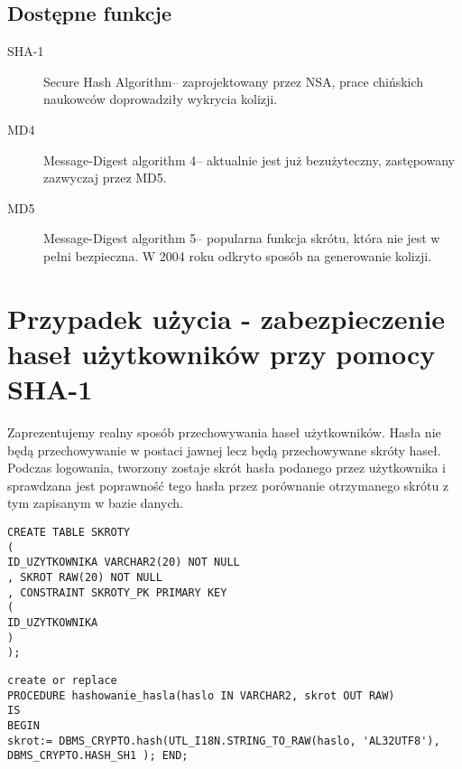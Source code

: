 \documentclass[12pt, a4paper]{article}
\begin{document}
\subsection{Dostępne funkcje}
\begin{description}
\item[SHA-1]Secure Hash Algorithm-- zaprojektowany przez NSA, prace chińskich naukowców doprowadziły wykrycia kolizji.
\item[MD4] Message-Digest algorithm 4-- aktualnie jest już bezużyteczny, zastępowany zazwyczaj przez MD5.
\item[MD5] Message-Digest algorithm 5-- popularna funkcja skrótu, która nie jest w pełni bezpieczna. W 2004 roku odkryto sposób na generowanie kolizji.
\end{description}

\section{Przypadek użycia - zabezpieczenie haseł użytkowników przy pomocy
\mbox{SHA-1}}
 Zaprezentujemy realny sposób przechowywania haseł użytkowników. Hasła nie będą
 przechowywanie w postaci jawnej lecz będą przechowywane skróty haseł. Podczas
 logowania, tworzony zostaje skrót hasła podanego przez użytkownika i sprawdzana
 jest poprawność tego hasła przez porównanie otrzymanego skrótu z tym zapisanym
 w bazie danych.
 
\begin{lstlisting}
CREATE TABLE SKROTY 
(
ID_UZYTKOWNIKA VARCHAR2(20) NOT NULL 
, SKROT RAW(20) NOT NULL 
, CONSTRAINT SKROTY_PK PRIMARY KEY 
(
ID_UZYTKOWNIKA 
)
);
\end{lstlisting}
 

 
\begin{lstlisting}
create or replace
PROCEDURE hashowanie_hasla(haslo IN VARCHAR2, skrot OUT RAW)
IS
BEGIN
skrot:= DBMS_CRYPTO.hash(UTL_I18N.STRING_TO_RAW(haslo, 'AL32UTF8'),
DBMS_CRYPTO.HASH_SH1 ); END;
\end{lstlisting}
\end{document}
